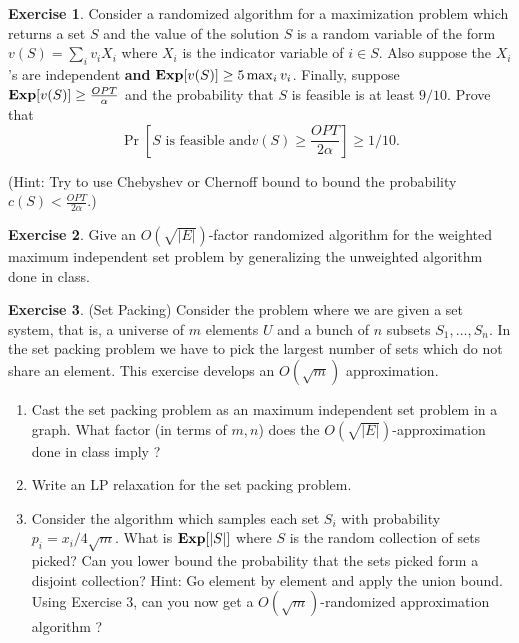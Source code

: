 \documentclass[11pt]{article}
\theoremstyle{definition}
\newtheorem{exercise}{Exercise}
\begin{document}
\begin{exercise}
Consider a randomized algorithm for a maximization problem which returns a set $S$ and  the value of the solution $S$ is a random variable of the form $v(S) = \sum_i v_iX_i$ where $X_i$ is the indicator variable of $i\in S$. Also suppose the $X_i$'s are independent {\bf and} $\mathbf{Exp}[v(S)] \geq 5\max_i v_i$. Finally, suppose $\mathbf{Exp}[v(S)] \geq \frac{OPT}{\alpha}$ and the probability that $S$ is feasible is at least $9/10$.
Prove that 
\[
\Pr[S \textrm{ is feasible and} v(S) \geq \frac{OPT}{2\alpha} ] \geq 1/10.
\]
\end{exercise}
\noindent
(Hint: Try to use Chebyshev or Chernoff bound to bound the probability $c(S) < \frac{OPT}{2\alpha}$.)
\vspace{1ex}

\begin{exercise}
Give an $O(\sqrt{|E|})$-factor randomized algorithm for the weighted maximum independent set problem by generalizing the 
unweighted algorithm done in class.
\end{exercise}
\vspace{1ex}

\begin{exercise} (Set Packing)
Consider the problem where we are given a set system, that is, a universe of $m$ elements $U$ and a bunch of $n$ subsets $S_1,\ldots, S_n$.
In the set packing problem we have to pick the largest number of sets which do not share an element.
This exercise develops an $O(\sqrt{m})$ approximation.
\begin{enumerate}
\item  Cast the set packing problem as an maximum independent set problem in a graph. What factor (in terms of $m,n$) does the $O(\sqrt{|E|})$-approximation done in class imply ?
\item Write an LP relaxation for the set packing problem. 
\item Consider the algorithm which samples each set $S_i$ with probability $p_i = x_i/4\sqrt{m}$. What is $\mathbf{Exp}[|S|]$ where $S$ is the random collection of sets picked?
Can you lower bound the probability that the sets picked form a disjoint collection? Hint: Go element by element and apply the union bound.
Using Exercise 3, can you now get a $O(\sqrt{m})$-randomized approximation algorithm ?
\end{enumerate}
\end{exercise}
\vspace{1ex}
\end{document}
